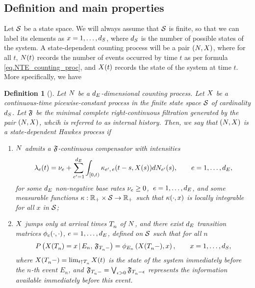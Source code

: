 \documentclass[10pt]{article}
\newtheorem{defi}[thm]{Definition}
\begin{document}
\subsection{Definition and main properties}\label{sec.sdHawkes_def_and_props}
Let $\stateSpace$ be a state space. We will always assume that $\stateSpace$ is finite, so that we can label its elements as $x=1, \dots, \numStates$, where $\numStates$ is the number of possible states of the system. A state-dependent counting process will be a pair $(\multiCountingProc, \stateVariable)$, where for all $t$, $\multiCountingProc(t)$ records the number of events occurred by time $t$ as per formula \eqref{eq.NTE_counting_proc}, and $\stateVariable(t)$ records the state of the system at time $t$. More specifically, we have
\begin{defi}[{\citealp[Definition 2.1]{MP18sta}}]\label{def.sdHawkes}
 Let $\multiCountingProc$ be a $\numEventTypes$-dimensional counting process. Let $\stateVariable$ be a continuous-time picewise-constant process in the finite state space $\stateSpace$ of cardinality $\numStates$. Let $\internalHistory$ be the minimal complete right-continuous filtration generated by the pair $(\multiCountingProc, \stateVariable)$, whcih is referred to as internal history. Then, we say that $(\multiCountingProc, \stateVariable)$ is a state-dependent Hawkes process if 
 \begin{enumerate}
  \item $\multiCountingProc$ admits a $\internalHistory$-continuous compensator with intensities
  \begin{equation}\label{eq.intensity_of_sdHawkes}
   \intensity(t) = \baseRate_e + \sum_{\eone=1}^{\numEventTypes}\int_{[0,t)} \hawkesKernel\subscriptee(t-s, \stateVariable(s))d\countingProc[\eone](s), \qquad e=1,\dots,\numEventTypes,
  \end{equation}
  for some $\numEventTypes$ non-negative base rates $\baseRate_e\geq 0$, $\, e=1, \dots, \numEventTypes$, and some measurable functions $\hawkesKernel: \R_+ \times \stateSpace \rightarrow \R_+$ such that $\hawkesKernel(\cdot, x)$ is locally integrable for all $x$ in $\stateSpace$;
  \item $\stateVariable$ jumps only at arrival times $\arrivalTimes[ ]_{n}$ of $\multiCountingProc$, and there exist $\numEventTypes$ transition matrices $\transProb_e(\cdot,\cdot)$, $e=1,\dots, \numEventTypes$, defined on $\stateSpace$ such that for all $n$
  \begin{equation}\label{eq.markov_update_stateVariable}
   \Prob\left( \stateVariable(\arrivalTimes[ ]_{n})=x \,  \vert \,  E_n, \, \internalHistory_{\arrivalTimes[ ]_{n}-} \right)
   =
   \transProb_{E_n}\left(\stateVariable(\arrivalTimes[ ]_{n}-),x\right),
   \qquad
   x=1, \dots, \numStates,
  \end{equation}
  where $\stateVariable(\arrivalTimes[ ]_{n}- ) = \lim_{t\uparrow \arrivalTimes[ ]_{n}} \stateVariable(t)$ is the state of the system immediately before the $n$-th event $E_n$, and $\internalHistory_{\arrivalTimes[ ]_{n}-} = \bigvee_{\epsilon>0} \internalHistory_{\arrivalTimes[ ]_{n} - \epsilon}$ represents the information available immediately before this event.
 \end{enumerate}
\end{defi}
\end{document}
